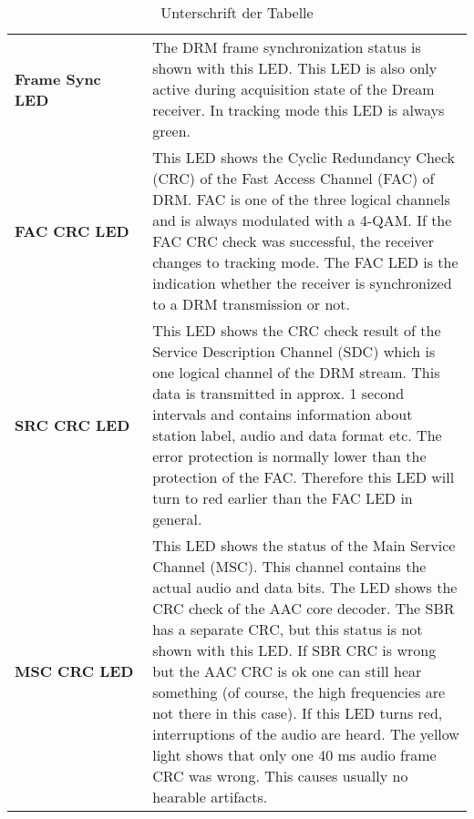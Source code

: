 \begin{table}[h]
\begin{center}
\begin{tabular}{p{0.3\linewidth} | p{0.7 \linewidth}}
			\textbf{Frame Sync LED} & The DRM frame synchronization status is shown with this LED. This LED is also only active during acquisition state of the Dream receiver. In tracking mode this LED is always green.
			\\
			\textbf{FAC CRC LED} & This LED shows the Cyclic Redundancy Check (CRC) of the Fast Access Channel (FAC) of DRM. FAC is one of the three logical channels and is always modulated with a 4-QAM. If the FAC CRC check was successful, the receiver changes to tracking mode. The FAC LED is the indication whether the receiver is synchronized to a DRM transmission or not. \\
			\textbf{SRC CRC LED} & 	This LED shows the CRC check result of the Service Description Channel (SDC) which is one logical channel of the DRM stream. This data is transmitted in approx. 1 second intervals and contains information about station label, audio and data format etc. The error protection is normally lower than the protection of the FAC. Therefore this LED will turn to red earlier than the FAC LED in general. \\
			\textbf{MSC CRC LED} & This LED shows the status of the Main Service Channel (MSC). This channel contains the actual audio and data bits. The LED shows the CRC check of the AAC core decoder. The SBR has a separate CRC, but this status is not shown with this LED. If SBR CRC is wrong but the AAC CRC is ok one can still hear something (of course, the high frequencies are not there in this case). If this LED turns red, interruptions of the audio are heard. The yellow light shows that only one 40 ms audio frame CRC was wrong. This causes usually no hearable artifacts.\\
			
			
			
			
			
			\hline
		\end{tabular}
		\caption{Unterschrift  der Tabelle}
		\label{tab:Tabelle1}
	\end{center}
\end{table}

